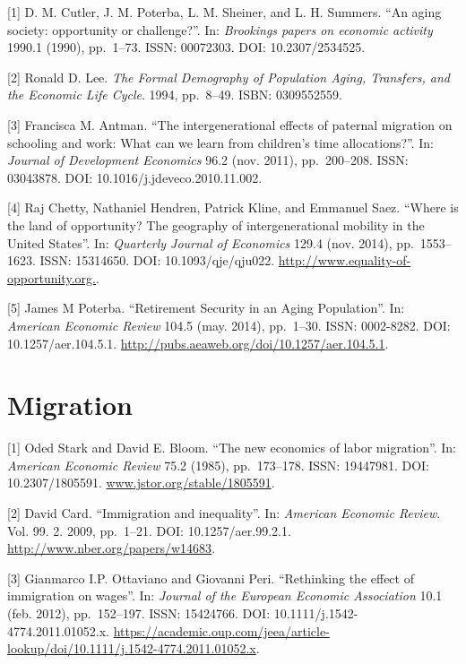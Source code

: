 \documentclass[
  12pt,
]{article}
\begin{document}
{[}1{]} D. M. Cutler, J. M. Poterba, L. M. Sheiner, and L. H. Summers.
``An aging society: opportunity or challenge?''. In:
\emph{Brookings papers on economic activity} 1990.1 (1990), pp.~1--73.
ISSN: 00072303. DOI: 10.2307/2534525.

{[}2{]} Ronald D. Lee.
\emph{The Formal Demography of Population Aging, Transfers, and the Economic Life Cycle}.
1994, pp.~8--49. ISBN: 0309552559.

{[}3{]} Francisca M. Antman. ``The intergenerational effects of paternal
migration on schooling and work: What can we learn from children's time
allocations?''. In: \emph{Journal of Development Economics} 96.2 (nov.
2011), pp.~200--208. ISSN: 03043878. DOI: 10.1016/j.jdeveco.2010.11.002.

{[}4{]} Raj Chetty, Nathaniel Hendren, Patrick Kline, and Emmanuel Saez.
``Where is the land of opportunity? The geography of intergenerational
mobility in the United States''. In:
\emph{Quarterly Journal of Economics} 129.4 (nov. 2014), pp.~1553--1623.
ISSN: 15314650. DOI: 10.1093/qje/qju022.
\url{http://www.equality-of-opportunity.org.}.

{[}5{]} James M Poterba. ``Retirement Security in an Aging Population''.
In: \emph{American Economic Review} 104.5 (may. 2014), pp.~1--30. ISSN:
0002-8282. DOI: 10.1257/aer.104.5.1.
\url{http://pubs.aeaweb.org/doi/10.1257/aer.104.5.1}.

\hypertarget{migration}{%
\section{\texorpdfstring{\textbf{Migration}}{Migration}}\label{migration}}

{[}1{]} Oded Stark and David E. Bloom. ``The new economics of labor
migration''. In: \emph{American Economic Review} 75.2 (1985),
pp.~173--178. ISSN: 19447981. DOI: 10.2307/1805591.
\url{www.jstor.org/stable/1805591}.

{[}2{]} David Card. ``Immigration and inequality''. In:
\emph{American Economic Review}. Vol. 99. 2. 2009, pp.~1--21. DOI:
10.1257/aer.99.2.1. \url{http://www.nber.org/papers/w14683}.

{[}3{]} Gianmarco I.P. Ottaviano and Giovanni Peri. ``Rethinking the
effect of immigration on wages''. In:
\emph{Journal of the European Economic Association} 10.1 (feb. 2012),
pp.~152--197. ISSN: 15424766. DOI: 10.1111/j.1542-4774.2011.01052.x.
\url{https://academic.oup.com/jeea/article-lookup/doi/10.1111/j.1542-4774.2011.01052.x}.
\end{document}
